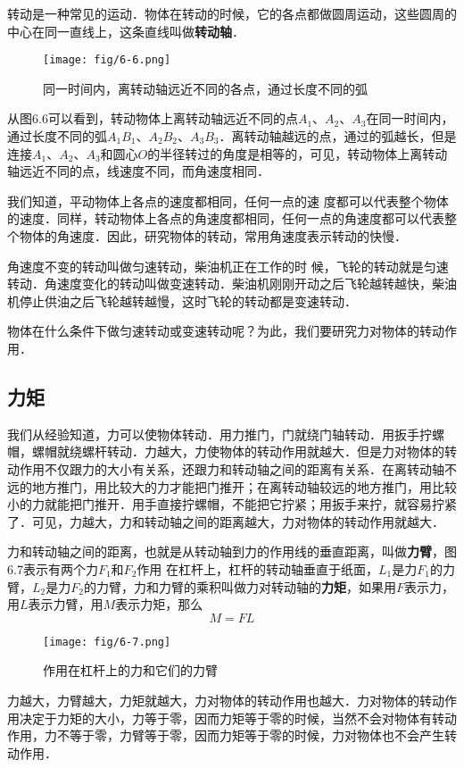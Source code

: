 转动是一种常见的运动．物体在转动的时候，它的各点都做圆周运动，这些圆周的中心在同一直线上，这条直线叫做\textbf{转动轴}．
\begin{figure}[htp]
\centering\texttt{[image: fig/6-6.png]}
\caption{同一时间内，离转动轴远近不同的各点，通过长度不同的弧}
\end{figure}

从图6.6可以看到，转动物体上离转动轴远近不同的点$A_1$、$A_2$、$A_3$在同一时间内，通过长度不同的弧$A_1B_1$、$A_2B_2$、$A_3B_3$．离转动轴越远的点，通过的弧越长，但是连接$A_1$、$A_2$、$A_3$和圆心$O$的半径转过的角度是相等的，可见，转动物体上离转动轴远近不同的点，线速度不同，而角速度相同．

我们知道，平动物体上各点的速度都相同，任何一点的速
度都可以代表整个物体的速度．同样，转动物体上各点的角速度都相同，任何一点的角速度都可以代表整个物体的角速度．因此，研究物体的转动，常用角速度表示转动的快慢．

角速度不变的转动叫做匀速转动，柴油机正在工作的时
候，飞轮的转动就是匀速转动．角速度变化的转动叫做变速转动．柴油机刚刚开动之后飞轮越转越快，柴油机停止供油之后飞轮越转越慢，这时飞轮的转动都是变速转动．

物体在什么条件下做匀速转动或变速转动呢？为此，我们要研究力对物体的转动作用．



\subsection{力矩} 

我们从经验知道，力可以使物体转动．用力推门，门就绕门轴转动．用扳手拧螺帽，螺帽就绕螺杆转动．力越大，力使物体的转动作用就越大．但是力对物体的转动作用不仅跟力的大小有关系，还跟力和转动轴之间的距离有关系．在离转动轴不远的地方推门，用比较大的力才能把门推开；在离转动轴较远的地方推门，用比较小的力就能把门推开．用手直接拧螺帽，不能把它拧紧；用扳手来拧，就容易拧紧了．可见，力越大，力和转动轴之间的距离越大，力对物体的转动作用就越大．

力和转动轴之间的距离，也就是从转动轴到力的作用线的垂直距离，叫做\textbf{力臂}，图6.7表示有两个力$F_1$和$F_2$作用
在杠杆上，杠杆的转动轴垂直于纸面，$L_1$是力$F_1$的力臂，$L_2$是力$F_2$的力臂，力和力臂的乘积叫做力对转动轴的\textbf{力矩}，如果用$F$表示力，用$L$表示力臂，用$M$表示力矩，那么
\[M=FL\]
\begin{figure}[htp]
\centering\texttt{[image: fig/6-7.png]}
\caption{作用在杠杆上的力和它们的力臂}
\end{figure}

力越大，力臂越大，力矩就越大，力对物体的转动作用也越大．力对物体的转动作用决定于力矩的大小，力等于零，因而力矩等于零的时候，当然不会对物体有转动作用，力不等于零，力臂等于零，因而力矩等于零的时候，力对物体也不会产生转动作用．

